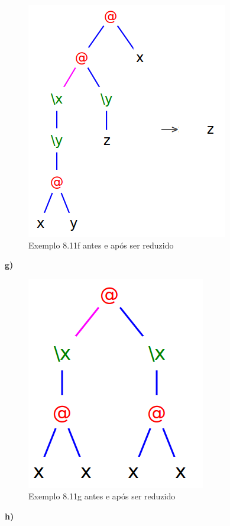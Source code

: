 \documentclass[a4paper]{article}
\begin{document}
\begin{figure}[h]
  \centering
  \includegraphics[scale=0.5]{8-11f.png}
  \caption{Exemplo 8.11f antes e após ser reduzido}
\end{figure}

\FloatBarrier

\textbf*{g)}

\begin{figure}[h]
  \centering
  \includegraphics[scale=0.4]{8-11g.png}
  \caption{Exemplo 8.11g antes e após ser reduzido}
\end{figure}

\FloatBarrier

\textbf{h)}
\end{document}
